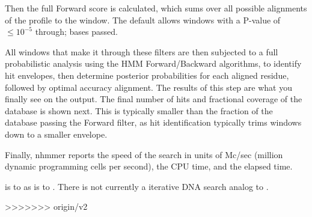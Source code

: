 Then the full Forward score is calculated, which sums over all
possible alignments of the profile to the window. The default allows
windows with a P-value of $\leq 10^{-5}$ through; \NMHnfwd{} bases
passed.

All windows that make it through these filters are then subjected to a
full probabilistic analysis using the HMM Forward/Backward algorithms,
to identify hit envelopes, then determine posterior probabilities for
each aligned residue, followed by optimal accuracy alignment. The
results of this step are what you finally see on the output. The final
number of hits and fractional coverage of the database is shown
next. This is typically smaller than the fraction of the database
passing the Forward filter, as hit identification typically trims
windows down to a smaller envelope.

Finally, nhmmer reports the speed of the search in units of Mc/sec
(million dynamic programming cells per second), the CPU time, and the
elapsed time.

 is to  as  is to
.  There is not currently a iterative DNA search
analog to .







>>>>>>> origin/v2
